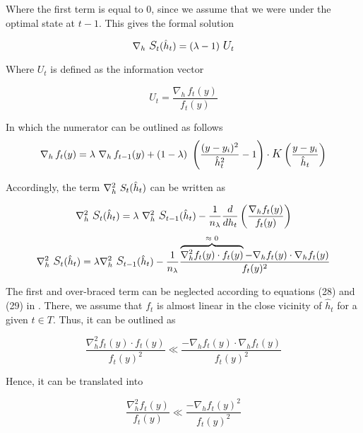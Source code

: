 Where the first term is equal to 0, since we assume that we were under the optimal state at $t-1$. This gives the formal solution

\begin{equation}
     \nabla_h \ \mathlarger{S}_t (\hat{h}_{t}) =  (\lambda - 1) \ \mathlarger{U}_t
\end{equation}

Where $U_t$ is defined as the information vector

\begin{equation}
     U_t =  \frac{\nabla _h \, f_t (y)}{f_t (y)}
\end{equation}

In which the numerator can be outlined as follows
\begin{equation}
    \nabla_{h}\, f_t (y) = \lambda \ \nabla_{h}\,f_{t-1}(y) + (1-\lambda) \ \left(\frac{(y - y_{i})^2}{\hat{h}_{t}^2} - 1\right) \cdot \mathlarger{K}\left(\frac{y - y_{i}}{\hat{h}_{t}}\right)
\end{equation}


Accordingly, the term $\nabla^2_h \ \mathlarger{S}_t (\hat{h}_{t})$ can be written as 

\begin{equation}
    \nabla^2_h \ \mathlarger{S}_t (\hat{h}_{t}) = \lambda \ \nabla^2_h \ \mathlarger{S}_{t-1} (\hat{h}_{t}) - \frac{1}{n_{\lambda}} \frac{d}{dh_{t}} \left(\frac{\nabla_h f_t (y)}{f_t (y)}\right)
\end{equation}
\begin{equation}
      \nabla^2_h \ \mathlarger{S}_t (\hat{h}_{t}) = \lambda \nabla^2_h \ \mathlarger{S}_{t-1} (\hat{h}_t) - \frac{1}{n_{\lambda}} \frac{\overbrace{\nabla^2_h f_t (y) \cdot f_t (y)}^{\text{$\approx$ 0}} - \nabla_h f_t (y) \cdot \nabla_h f_t (y) }{f_t (y) ^2}
\end{equation}

The first and over-braced term can be neglected according to equations (28) and (29) in \cite{Pinson_Madsen_2012}. There, we assume that $f_t$ is almost linear in the close vicinity of $\hat{h}_t$ for a given $t \in T$. Thus, it can be outlined as 

\begin{equation}
    \frac{\nabla^2_h f_t (y) \cdot f_t (y)}{f_t (y)^2} \ll \frac{- \nabla_h f_t (y) \cdot \nabla_h f_t (y) }{f_t (y) ^2}
\end{equation}

Hence, it can be translated into 

\begin{equation}
    \frac{\nabla^2_h f_t (y)}{f_t (y)} \ll \frac{- \nabla_h f_t (y)^2 }{f_t (y) ^2}
\end{equation}

